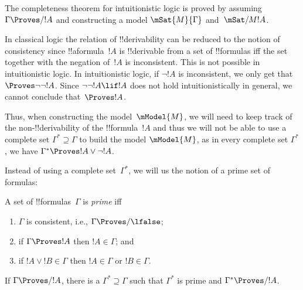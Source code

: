 \documentclass[../../../include/open-logic-section]{subfiles}
\begin{document}


The completeness theorem for intuitionistic logic is proved by assuming
$\Gamma \Proves/ !A$ and constructing a model $\mSat{M}{\Gamma}$ and~$\mSat/{M}{!A}$.

In classical logic the relation of !!{derivability} can be reduced to
the notion of consistency since !!a{formula}~$!A$ is !!{derivable}
from a set of !!{formula}s iff the set together with the negation
of~$!A$ is inconsistent. This is not possible in intuitionistic logic.
In intuitionistic logic, if $\lnot!A$ is inconsistent, we only get
that $\Proves \lnot\lnot !A$. Since $\lnot\lnot!A \lif !A$ does not
hold intuitionistically in general, we cannot conclude that~$\Proves
!A$.

Thus, when constructing the model~$\mModel{M}$, we will need to keep track 
of the non-!!{derivability} of the !!{formula}~$!A$ and thus we will not be 
able to use a complete set $\Gamma^* \supseteq \Gamma$ to build the model
$\mModel{M}$, as in every complete set $\Gamma^*$, we have
$\Gamma^* \Proves !A \lor \lnot !A$.

Instead of using a complete set~$\Gamma^*$, we will us the notion of
a prime set of formulas:

\begin{defn}
  A set of !!{formula}s~$\Gamma$ is \emph{prime} iff 
  \begin{enumerate}
  \item{} $\Gamma$ is consistent, i.e., $\Gamma \Proves/ \lfalse$;
  \item{} if $\Gamma \Proves !A$ then $!A \in \Gamma$; and
  \item{} if $!A \lor !B \in \Gamma$ then $!A \in
    \Gamma$ or $!B \in \Gamma$.
  \end{enumerate}
\end{defn}

\begin{lem}
   If $\Gamma \Proves/ !A$, there is a
  $\Gamma^* \supseteq \Gamma$ such that $\Gamma^*$ is prime and
  $\Gamma^* \Proves/ !A$.
\end{lem}
\end{document}
